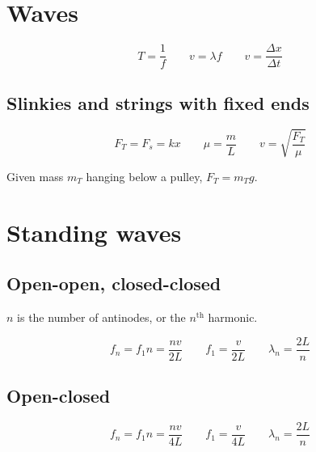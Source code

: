 \section{Waves}

\[
	T = \frac{1}{f} \qquad
	v = \lambda f \qquad
	v = \frac{\Delta x}{\Delta t}
\]

\subsection{Slinkies and strings with fixed ends}

\[
	F_T = F_s = kx \qquad
	\mu = \frac{m}{L} \qquad
	v = \sqrt{\frac{F_T}{\mu}}
\]

Given mass $m_T$ hanging below a pulley, $F_T = m_T g$.


\section{Standing waves}

\subsection{Open-open, closed-closed}

$n$ is the number of antinodes, or the $n^\text{th}$ harmonic.

\[
	f_n = f_1 n = \frac{nv}{2L} \qquad f_1 = \frac{v}{2L} \qquad \lambda_n = \frac{2L}{n}
\]

\subsection{Open-closed}

\[
	f_n = f_1 n = \frac{nv}{4L} \qquad f_1 = \frac{v}{4L} \qquad \lambda_n = \frac{2L}{n}
\]






